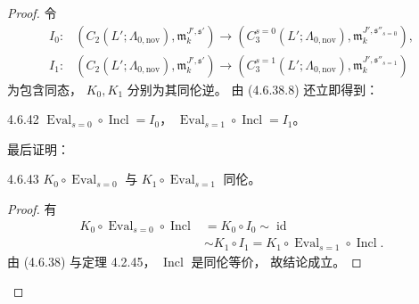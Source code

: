 \begin{proof}
令
\[
\begin{aligned}
I_0\colon
&(C_2(L';\Lambda_{0,\mathrm{nov}}),
  \mathfrak m_k^{J',\mathfrak s'})
\longrightarrow
(C_3^{s=0}(L';\Lambda_{0,\mathrm{nov}}),
  \mathfrak m_k^{J',\mathfrak s''_{s=0}}),\\
I_1\colon
&(C_2(L';\Lambda_{0,\mathrm{nov}}),
  \mathfrak m_k^{J',\mathfrak s'})
\longrightarrow
(C_3^{s=1}(L';\Lambda_{0,\mathrm{nov}}),
  \mathfrak m_k^{J',\mathfrak s''_{s=1}})
\end{aligned}
\]
为包含同态，
$K_0,K_1$ 分别为其同伦逆。
由 (4.6.38.8) 还立即得到：
\begin{lemma}{4.6.42}\label{lem:4-6-42}
$\operatorname{Eval}_{s=0}\circ
\operatorname{Incl}=I_0$，
$\operatorname{Eval}_{s=1}\circ
\operatorname{Incl}=I_1$。
\end{lemma}
最后证明：
\begin{lemma}{4.6.43}\label{lem:4-6-43}
$K_0\circ\operatorname{Eval}_{s=0}$
与 $K_1\circ\operatorname{Eval}_{s=1}$ 同伦。
\end{lemma}
\begin{proof}
有
\[
\begin{aligned}
K_0\circ\operatorname{Eval}_{s=0}
\circ\operatorname{Incl}
&=K_0\circ I_0
\sim\operatorname{id}\\
&\sim K_1\circ I_1
=K_1\circ\operatorname{Eval}_{s=1}
\circ\operatorname{Incl}.
\end{aligned}
\]
由 (4.6.38) 与定理 4.2.45，
$\operatorname{Incl}$ 是同伦等价，
故结论成立。
\end{proof}


\end{proof}
